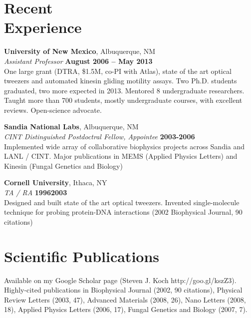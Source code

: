 \documentclass[margin,line]{resume}
\begin{document}
\begin{resume}
    \section{\mysidestyle Recent\\Experience}

    \textbf{University of New Mexico}, Albuquerque, NM \vspace{2mm}\\\vspace{1mm}%
    \textsl{Assistant Professor} \hfill \textbf{August 2006 -- May 2013}\\
    One large grant (DTRA, \$1.5M, co-PI with Atlas), state of the art optical tweezers and automated kinesin gliding motility assays. Two Ph.D. students graduated, two more expected in 2013. Mentored 8 undergraduate researchers. Taught more than 700 students, mostly undergraduate courses, with excellent reviews.  Open-science advocate.

    \textbf{Sandia National Labs}, Albuquerque, NM \vspace{2mm}\\\vspace{1mm}%
    \textsl{CINT Distinguished Postdoctral Fellow, Appointee} \hfill \textbf{2003-2006}\\
    Implemented wide array of collaborative biophysics projects across Sandia and LANL / CINT.  Major publications in MEMS (Applied Physics Letters) and Kinesin (Fungal Genetics and Biology)

    \textbf{Cornell University}, Ithaca, NY \vspace{2mm}\\\vspace{1mm}%
    \textsl{TA / RA} \hfill \textbf{19962003}\\
    Designed and built state of the art optical tweezers. Invented single-molecule technique for probing protein-DNA interactions (2002 Biophysical Journal, 90 citations)
    
    
    \section{\mysidestyle Scientific Publications}
    
    Available on my Google Scholar page (Steven J. Koch http://goo.gl/kszZ3).  Highly-cited publications in Biophysical Journal (2002, 90 citations), Physical Review Letters (2003, 47), Advanced Materials (2008, 26), Nano Letters (2008, 18), Applied Physics Letters (2006, 17), Fungal Genetics and Biology (2007, 7).
    

\end{resume}
\end{document}
